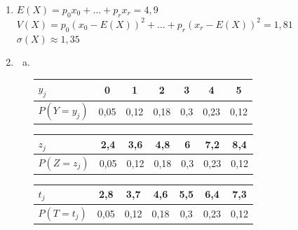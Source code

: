 \documentclass[12pt, a4paper]{article}
\begin{document}
    \begin{Exercise}[number={51}]
      \begin{enumerate}[1)]
        \item $E(X)=p_0x_0+\dots+p_rx_r=4{,}9$ \\ $V(X)=p_0(x_0-E(X))^2+\dots+p_r(x_r-E(X))^2=1{,}81$ \\ $\sigma(X)\approx 1{,}35$
        \item \begin{enumerate}[a)]
              \item \ \begin{center}\begin{tabular}{ | l || *{6}{c|} }
                      \hline
                      $y_j$                     & 0      & 1      & 2      & 3     & 4      & 5      \\ \hline
                      $P(Y=y_j)$ \hspace{0.5cm} & 0{,}05 & 0{,}12 & 0{,}18 & 0{,}3 & 0{,}23 & 0{,}12 \\ \hline
                    \end{tabular}\end{center}
                    \parbox{\linewidth}{}

                    \begin{center}\begin{tabular}{ | l || *{6}{c|} }
                      \hline
                      $z_j$                     & 2{,}4  & 3{,}6  & 4{,}8  & 6     & 7{,}2  & 8{,}4  \\ \hline
                      $P(Z=z_j)$ \hspace{0.5cm} & 0{,}05 & 0{,}12 & 0{,}18 & 0{,}3 & 0{,}23 & 0{,}12 \\ \hline
                    \end{tabular}\end{center}
                    \parbox{\linewidth}{}

                    \begin{center}\begin{tabular}{ | l || *{6}{c|} }
                      \hline
                      $t_j$                     & 2{,}8  & 3{,}7  & 4{,}6  & 5{,}5 & 6{,}4  & 7{,}3  \\ \hline
                      $P(T=t_j)$ \hspace{0.5cm} & 0{,}05 & 0{,}12 & 0{,}18 & 0{,}3 & 0{,}23 & 0{,}12 \\ \hline
                    \end{tabular}\end{center} 
                    \parbox{\linewidth}{}


\end{enumerate}
\end{enumerate}
\end{Exercise}
\end{document}
